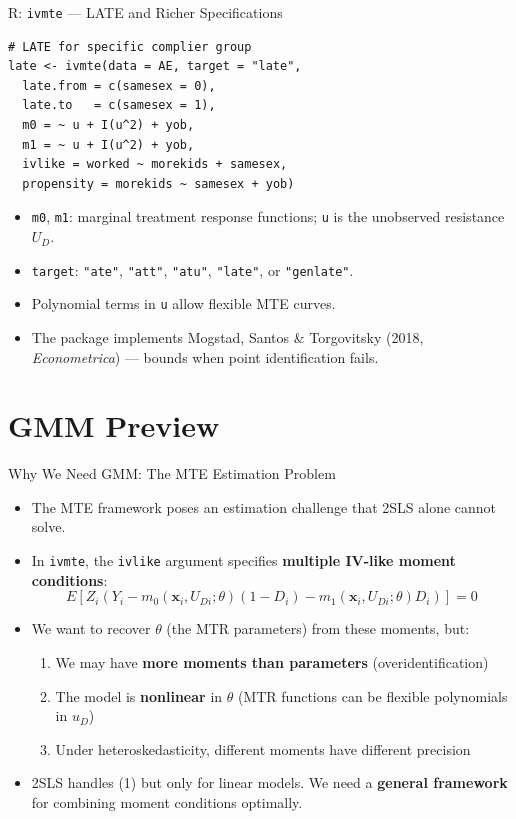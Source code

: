 \documentclass[aspectratio=169, handout]{beamer}
\numberwithin{equation}{section}
\begin{document}
\begin{frame}[fragile]{R: \texttt{ivmte} --- LATE and Richer Specifications}
\begin{lstlisting}
# LATE for specific complier group
late <- ivmte(data = AE, target = "late",
  late.from = c(samesex = 0),
  late.to   = c(samesex = 1),
  m0 = ~ u + I(u^2) + yob,
  m1 = ~ u + I(u^2) + yob,
  ivlike = worked ~ morekids + samesex,
  propensity = morekids ~ samesex + yob)
\end{lstlisting}
\begin{itemize}
\item \texttt{m0}, \texttt{m1}: marginal treatment response functions; \texttt{u} is the unobserved resistance $U_D$.
\item \texttt{target}: \texttt{"ate"}, \texttt{"att"}, \texttt{"atu"}, \texttt{"late"}, or \texttt{"genlate"}.
\item Polynomial terms in \texttt{u} allow flexible MTE curves.
\item The package implements Mogstad, Santos \& Torgovitsky (2018, \textit{Econometrica}) --- bounds when point identification fails.
\end{itemize}
\end{frame}


\section{GMM Preview}

\begin{frame}{Why We Need GMM: The MTE Estimation Problem}
\begin{itemize}
\item The MTE framework poses an estimation challenge that 2SLS alone cannot solve.
\item In \texttt{ivmte}, the \texttt{ivlike} argument specifies \textbf{multiple IV-like moment conditions}:
$$E[Z_i(Y_i - m_0(\bm{x}_i, U_{Di};\theta)(1-D_i) - m_1(\bm{x}_i, U_{Di};\theta)D_i)] = 0$$
\item We want to recover $\theta$ (the MTR parameters) from these moments, but:
\begin{enumerate}
\item We may have \textbf{more moments than parameters} (overidentification)
\item The model is \textbf{nonlinear} in $\theta$ (MTR functions can be flexible polynomials in $u_D$)
\item Under heteroskedasticity, different moments have different precision
\end{enumerate}
\item 2SLS handles (1) but only for linear models.  We need a \textbf{general framework} for combining moment conditions optimally.
\end{itemize}
\end{frame}
\end{document}
